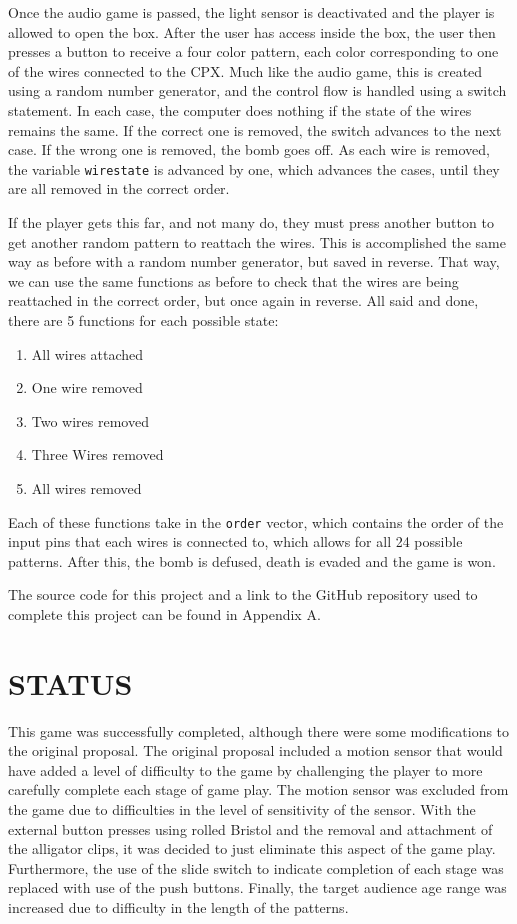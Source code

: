 \documentclass[12pt]{article}
\begin{document}
Once the audio game is passed, the light sensor is deactivated and the player is allowed to open the box. After the user has access inside the box, the user then presses a button to receive a four color pattern, each color corresponding to one of the wires connected to the CPX. Much like the audio game, this is created using a random number generator, and the control flow is handled using a switch statement. In each case, the computer does nothing if the state of the wires remains the same. If the correct one is removed, the switch advances to the next case. If the wrong one is removed, the bomb goes off. As each wire is removed, the variable \texttt{wirestate} is advanced by one, which advances the cases, until they are all removed in the correct order.

If the player gets this far, and not many do, they must press another button to get another random pattern to reattach the wires. This is accomplished the same way as before with a random number generator, but saved in reverse. That way, we can use the same functions as before to check that the wires are being reattached in the correct order, but once again in reverse. All said and done, there are 5 functions for each possible state:
\begin{enumerate}
    \item All wires attached
    \item One wire removed
    \item Two wires removed
    \item Three Wires removed
    \item All wires removed
\end{enumerate}
Each of these functions take in the \texttt{order} vector, which contains the order of the input pins that each wires is connected to, which allows for all 24 possible patterns. After this, the bomb is defused, death is evaded and the game is won.

The source code for this project and a link to the GitHub repository used to complete this project can be found in Appendix A.

\section{STATUS}

This game was successfully completed, although there were some modifications to the original proposal.  The original proposal included a motion sensor that would have added a level of difficulty to the game by challenging the player to more carefully complete each stage of game play.  The motion sensor was excluded from the game due to difficulties in the level of sensitivity of the sensor.  With the external button presses using rolled Bristol and the removal and attachment of the alligator clips, it was decided to just eliminate this aspect of the game play.  Furthermore, the use of the slide switch to indicate completion of each stage was replaced with use of the push buttons.  Finally, the target audience age range was increased due to difficulty in the length of the patterns. 
\end{document}
